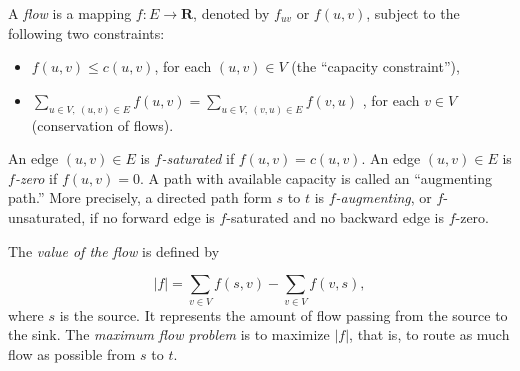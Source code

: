 A {\it flow}
is a mapping $f: E\to {\mathbf{R}}$, denoted by $f_{uv}$ or 
$f(u,v)$, subject to the following two constraints:
\begin{itemize}
\item
$f(u,v)\leq c(u,v)$, for each $(u,v) \in V$ (the ``capacity constraint''),
\item
$\sum_{u\in V,\ (u,v)\in E} f(u,v) = \sum_{u\in V,\ (v, u)\in E} f(v, u)$ ,
for each $v\in V$ (conservation of flows).
\end{itemize}
An edge $(u,v) \in E$ is {\it $f$-saturated} 
if $f(u,v)=c(u,v)$.
An edge $(u,v) \in E$ is {\it $f$-zero} if $f(u,v)=0$.
A path with available capacity is called an ``augmenting path.''
More precisely, a directed path form $s$ to $t$ is 
{\it $f$-augmenting}, or
$f$-unsaturated, if no forward 
edge is $f$-saturated and no backward edge is $f$-zero.

The {\it value of the flow} is defined by 

\[
| f | = \sum_{v\in V}f(s,v)-\sum_{v\in V}f(v,s), 
\]
where $s$ is the source. 
It represents the amount of flow passing from the source to the sink.
The {\it maximum flow problem} is to maximize $| f |$, that is, to route as 
much flow as possible from $s$ to $t$.

